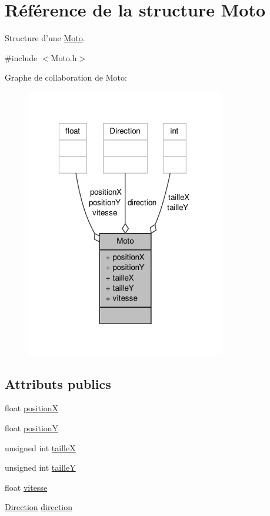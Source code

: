 \hypertarget{structMoto}{\section{Référence de la structure Moto}
\label{structMoto}
}


Structure d'une \hyperlink{structMoto}{Moto}.  




{\ttfamily \#include $<$Moto.\-h$>$}



Graphe de collaboration de Moto\-:
\nopagebreak
\begin{figure}[H]
\begin{center}
\leavevmode
\includegraphics[width=247pt]{structMoto__coll__graph}
\end{center}
\end{figure}
\subsection*{Attributs publics}
\begin{DoxyCompactItemize}
\item 
float \hyperlink{structMoto_a7d9695eb69a7161d1a6800e4b8bc4170}{position\-X}
\item 
float \hyperlink{structMoto_a68859bbff76786aedccab8093a9de5a8}{position\-Y}
\item 
unsigned int \hyperlink{structMoto_a15d1b56209aba6ea0bc8eeaac82ae625}{taille\-X}
\item 
unsigned int \hyperlink{structMoto_ab7b358839b7d20f16a4a17e5eabad5a4}{taille\-Y}
\item 
float \hyperlink{structMoto_a561dfc3e54a534dfa92ccecbea8dbe71}{vitesse}
\item 
\hyperlink{Moto_8h_a224b9163917ac32fc95a60d8c1eec3aa}{Direction} \hyperlink{structMoto_ace42f991dc2d223029ca7f7162a10e9b}{direction}
\end{DoxyCompactItemize}


